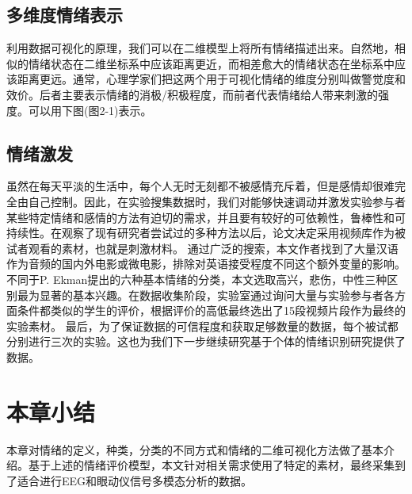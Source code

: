 	 \subsection{多维度情绪表示}
	 利用数据可视化的原理，我们可以在二维模型上将所有情绪描述出来。自然地，相似的情绪状态在二维坐标系中应该距离更近，而相差愈大的情绪状态在坐标系中应该距离更远。通常，心理学家们把这两个用于可视化情绪的维度分别叫做警觉度和效价。后者主要表示情绪的消极/积极程度，而前者代表情绪给人带来刺激的强度。可以用下图(图2-1)表示。
	 \subsection{情绪激发}
	 虽然在每天平淡的生活中，每个人无时无刻都不被感情充斥着，但是感情却很难完全由自己控制。因此，在实验搜集数据时，我们对能够快速调动并激发实验参与者某些特定情绪和感情的方法有迫切的需求，并且要有较好的可依赖性，鲁棒性和可持续性。在观察了现有研究者尝试过的多种方法以后，论文决定采用视频库作为被试者观看的素材，也就是刺激材料。
	 通过广泛的搜索，本文作者找到了大量汉语作为音频的国内外电影或微电影，排除对英语接受程度不同这个额外变量的影响。不同于P. Ekman提出的六种基本情绪的分类，本文选取高兴，悲伤，中性三种区别最为显著的基本兴趣。在数据收集阶段，实验室通过询问大量与实验参与者各方面条件都类似的学生的评价，根据评价的高低最终选出了15段视频片段作为最终的实验素材。
	 最后，为了保证数据的可信程度和获取足够数量的数据，每个被试都分别进行三次的实验。这也为我们下一步继续研究基于个体的情绪识别研究提供了数据。
\section{本章小结}
	本章对情绪的定义，种类，分类的不同方式和情绪的二维可视化方法做了基本介绍。基于上述的情绪评价模型，本文针对相关需求使用了特定的素材，最终采集到了适合进行EEG和眼动仪信号多模态分析的数据。

